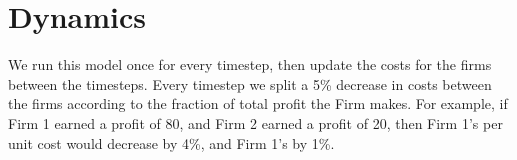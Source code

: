 \documentclass[11pt]{article}
\begin{document}
\section{Dynamics}
We run this model once for every timestep, then update the costs for the firms
between the timesteps. Every timestep we split a 5\% decrease in costs between
the firms according to the fraction of total profit the Firm makes. For
example, if Firm 1 earned a profit of 80, and Firm 2 earned a profit of 20,
then Firm 1's per unit cost would decrease by 4\%, and Firm 1's by 1\%.

\newpage
\printbibliography
\end{document}
